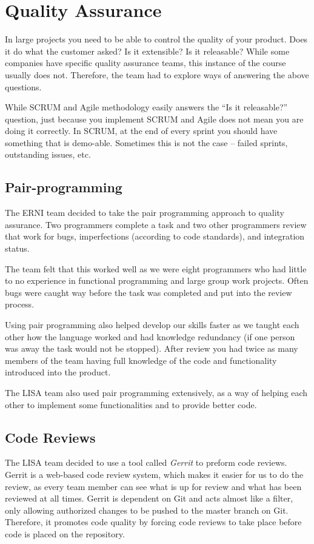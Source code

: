 \section {Quality Assurance}
In large projects you need to be able to control the quality of your product. Does it do what the customer asked? Is it extensible? Is it releasable? While some companies have specific quality assurance teams, this instance of the course usually does not. Therefore, the team had to explore ways of answering the above questions.

While SCRUM and Agile methodology easily answers the ``Is it releasable?'' question, just because you implement SCRUM and Agile does not mean you are doing it correctly. In SCRUM, at the end of every sprint you should have something that is demo-able. Sometimes this is not the case -- failed sprints, outstanding issues, etc.

\subsection{Pair-programming}

The ERNI team decided to take the pair programming approach to quality assurance. Two programmers complete a task and two other programmers review that work for bugs, imperfections (according to code standards), and integration status. 

The team felt that this worked well as we were eight programmers who had little to no experience in functional programming and large group work projects. Often bugs were caught way before the task was completed and put into the review process. 

Using pair programming also helped develop our skills faster as we taught each other how the language worked and had knowledge redundancy (if one person was away the task would not be stopped). After review you had twice as many members of the team having full knowledge of the code and functionality introduced into the product.

The LISA team also used pair programming extensively, as a way of helping each other to implement some functionalities and to provide better code.

\subsection{Code Reviews}

The LISA team decided to use a tool called \textit{Gerrit} to preform code reviews. Gerrit is a web-based code review system, which makes it easier for us to do the review, as every team member can see what is up for review and what has been reviewed at all times. Gerrit is dependent on Git and acts almost like a filter, only allowing authorized changes to be pushed to the master branch on Git. Therefore, it promotes code quality by forcing code reviews to take place before code is placed on the repository.

